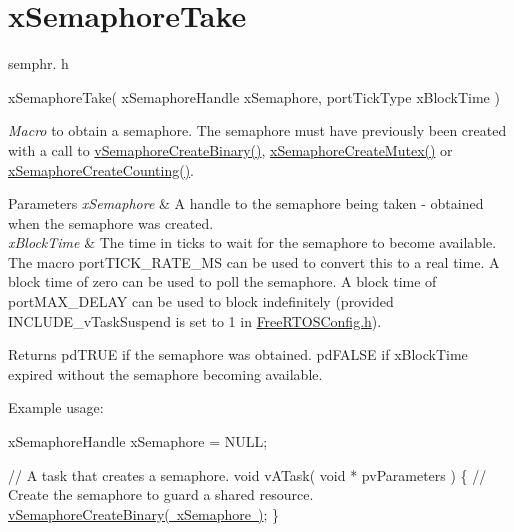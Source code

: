 \hypertarget{group__x_semaphore_take}{}\section{x\+Semaphore\+Take}
\label{group__x_semaphore_take}
semphr. h 
\begin{DoxyPre}xSemaphoreTake( 
                    xSemaphoreHandle xSemaphore, 
                    portTickType xBlockTime 
                )\end{DoxyPre}


{\itshape Macro} to obtain a semaphore. The semaphore must have previously been created with a call to \mbox{\hyperlink{semphr_8h_ae10bffadd26fbd5bcce76bf33a83ef30}{v\+Semaphore\+Create\+Binary()}}, \mbox{\hyperlink{semphr_8h_aa6a00aa9b91a9e5b3ebe4ae1c3f115c6}{x\+Semaphore\+Create\+Mutex()}} or \mbox{\hyperlink{semphr_8h_a7764616a918a46115403569a88148ad4}{x\+Semaphore\+Create\+Counting()}}.


\begin{DoxyParams}{Parameters}
{\em x\+Semaphore} & A handle to the semaphore being taken -\/ obtained when the semaphore was created.\\
\hline
{\em x\+Block\+Time} & The time in ticks to wait for the semaphore to become available. The macro port\+T\+I\+C\+K\+\_\+\+R\+A\+T\+E\+\_\+\+MS can be used to convert this to a real time. A block time of zero can be used to poll the semaphore. A block time of port\+M\+A\+X\+\_\+\+D\+E\+L\+AY can be used to block indefinitely (provided I\+N\+C\+L\+U\+D\+E\+\_\+v\+Task\+Suspend is set to 1 in \mbox{\hyperlink{_free_r_t_o_s_config_8h}{Free\+R\+T\+O\+S\+Config.\+h}}).\\
\hline
\end{DoxyParams}
\begin{DoxyReturn}{Returns}
pd\+T\+R\+UE if the semaphore was obtained. pd\+F\+A\+L\+SE if x\+Block\+Time expired without the semaphore becoming available.
\end{DoxyReturn}
Example usage\+: 
\begin{DoxyPre}
xSemaphoreHandle xSemaphore = NULL;\end{DoxyPre}



\begin{DoxyPre}// A task that creates a semaphore.
void vATask( void * pvParameters )
\{
   // Create the semaphore to guard a shared resource.
   \mbox{\hyperlink{semphr_8h_ae10bffadd26fbd5bcce76bf33a83ef30}{vSemaphoreCreateBinary( xSemaphore )}};
\}\end{DoxyPre}



